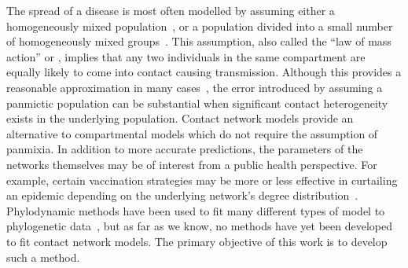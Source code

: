 
The spread of a disease is most often modelled by assuming either a
homogeneously mixed population~\autocite{hamer1906milroy,
kermack1927contribution}, or a population divided into a small number of
homogeneously mixed groups~\autocite{rushton1955deterministic}. This
assumption, also called the ``law of mass action'' or , implies
that any two individuals in the same compartment are equally likely to come
into contact causing transmission. Although this provides a reasonable
approximation in many cases~\autocite{anderson1992infectious}, the error
introduced by assuming a panmictic population can be substantial when
significant contact heterogeneity exists in the underlying population. Contact
network models provide an alternative to compartmental models which do not
require the assumption of panmixia. In addition to more accurate predictions,
the parameters of the networks themselves may be of interest from a public
health perspective. For example, certain vaccination strategies may be more or
less effective in curtailing an epidemic depending on the underlying network's
degree distribution~\autocite{peng2013vaccination}. Phylodynamic methods have
been used to fit many different types of model to phylogenetic
data~\autocite{pybus2009evolutionary,volz2013viral}, but as far as we know, no
methods have yet been developed to fit contact network models. The primary
objective of this work is to develop such a method.

\newcommand{\G}{\mathcal{G}}
\newcommand{\Nu}{\mathcal{N}}

